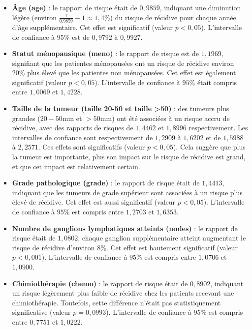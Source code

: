 \documentclass[../main.tex]{subfiles}
\begin{document}
\begin{CJK*}{UTF8}{gbsn}
\begin{itemize}
  \item \textbf{Âge (age)} : le rapport de risque était de $0,9859$, 
  indiquant une diminution légère (environ $\frac{1}{0.9859} - 1 \approx 1,4\%$) du risque de récidive 
  pour chaque année d'âge supplémentaire. Cet effet est significatif 
  (valeur \( p < 0,05 \)). L'intervalle de confiance à $95 \%$ est de $0,9792$ à $0,9927$.
  \item \textbf{Statut ménopausique (meno)} : 
  le rapport de risque est de $1,1969$, signifiant 
  que les patientes ménopausées ont un risque de récidive environ 
  $20\%$ plus élevé que les patientes non ménopausées. 
  Cet effet est également significatif (valeur \( p < 0,05 \)). 
  L'intervalle de confiance à $95 \%$ était compris entre $1,0069$ et $1,4228$.
  \item \textbf{Taille de la tumeur (taille 20-50 et taille >50)} : 
  des tumeurs plus grandes ($20-50 \text{mm}$ et $> 50 \text{mm}$) 
  ont été associées à un risque accru de récidive, 
  avec des rapports de risques de $1,4462$ et $1,8996$ respectivement. 
  Les intervalles de confiance sont respectivement de $1,2909$ à $1,6202$ et de $1,5988$ à $2,2571$. 
  Ces effets sont significatifs (valeur \( p < 0,05 \)). 
  Cela suggère que plus la tumeur est importante, 
  plus son impact sur le risque de récidive est grand, 
  et que cet impact est relativement certain.
  \item \textbf{Grade pathologique (grade)} : 
  le rapport de risque était de $1,4413$, 
  indiquant que les tumeurs de grade supérieur 
  sont associées à un risque plus élevé de récidive. 
  Cet effet est aussi significatif (valeur \( p < 0,05 \)). 
  L'intervalle de confiance à $95 \%$ est compris entre $1,2703$ et $1,6353$.
  \item \textbf{Nombre de ganglions lymphatiques atteints (nodes)} : 
  le rapport de risque était de $1,0802$, 
  chaque ganglion supplémentaire atteint augmentant le risque de récidive d'environ $8\%$. 
  Cet effet est hautement significatif (valeur \( p < 0,001 \)). 
  L'intervalle de confiance à $95 \%$ est compris entre $1,0706$ et $1,0900$.
  \item \textbf{Chimiothérapie (chemo)} : 
  le rapport de risque était de $0,8902$, 
  indiquant un risque légèrement plus faible de récidive 
  chez les patients recevant une chimiothérapie. 
  Toutefois, cette différence n'était pas statistiquement significative (valeur \( p = 0,0993 \)). 
  L'intervalle de confiance à $95 \%$ est compris entre $0,7751$ et $1,0222$.
\end{itemize}


\end{CJK*}
\end{document}
